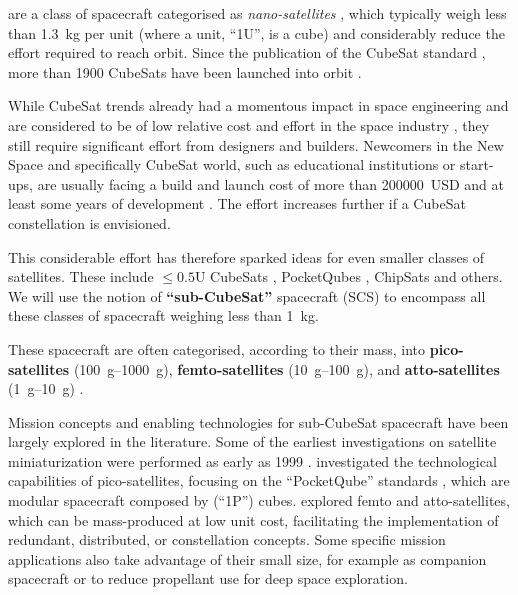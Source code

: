 \documentclass[journal,10pt]{IEEEtran}
\begin{document}
 are a class of spacecraft categorised as \emph{nano-satellites} \autocite{kuluNanosatsDatabase2023}, which typically weigh less than \SI{1.3}{\kilo\gram} per unit (where a unit, ``1U'', is a  cube) and considerably reduce the effort required to reach orbit.
Since the publication of the CubeSat standard \cite{CDS14}, more than 1900 CubeSats have been launched into orbit \autocite{kuluNanosatsDatabase2023}.

While CubeSat trends already had a momentous impact in space engineering and are considered to be of low relative cost and effort in the space industry \autocite{poghosyanCubeSatEvolutionAnalyzing2017, sweetingModernSmallSatellitesChanging2018}, they still require significant effort from designers and builders. Newcomers in the New Space and specifically CubeSat world, such as educational institutions or start-ups, are usually facing a build and launch cost of more than \SI{200000}{USD} and at least some years of development \autocite{nasacubesatlaunchinitiativeCubeSat101Basic2017}. The effort increases further if a CubeSat constellation is envisioned.

This considerable effort has therefore sparked ideas for even smaller classes of satellites.
These include \( \leq 0.5\mathrm{U}\) CubeSats \autocite{kuluNanosatsDatabase2023},
PocketQubes \autocite{PQ1},
ChipSats \autocite{manchesterCentimeterScaleSpacecraftDesign2015} and others.
We will use the notion of \textbf{``sub-CubeSat''} spacecraft (\acs{SCS}) to encompass all these classes of spacecraft weighing less than \SI{1}{\kilo\gram}.

These spacecraft are often categorised, according to their mass, into
\textbf{pico-satellites} (\SIrange{100}{1000}{\gram}),
\textbf{femto-satellites} (\SIrange{10}{100}{\gram}), and
\textbf{atto-satellites} (\SIrange{1}{10}{\gram})
\autocite{sweetingModernSmallSatellitesChanging2018,heinAttoSatsChipSatsOther2019}.

Mission concepts and enabling technologies for sub-CubeSat spacecraft have been largely explored in the literature. Some of the earliest investigations on satellite miniaturization were performed as early as 1999 \autocite{jansonMassproducibleSiliconSpacecraft1999,barnhartEnablingSpaceSensor2007}.
\citeauthor{sperettaCubeSatsPocketQubesOpportunities2016} \autocite{sperettaCubeSatsPocketQubesOpportunities2016} investigated the technological capabilities of pico-satellites, focusing on the ``PocketQube'' standards \autocite{PQ1,PQ91}, which are modular spacecraft composed by  (``1P'') cubes. \citeauthor{heinAttoSatsChipSatsOther2019,perezSurveyCurrentFemtosatellite2016} \autocite{heinAttoSatsChipSatsOther2019,perezSurveyCurrentFemtosatellite2016} explored femto and atto-satellites, which can be mass-produced at low unit cost, facilitating the implementation of redundant, distributed, or constellation concepts. Some specific mission applications also take advantage of their small size, for example as companion spacecraft or to reduce propellant use for deep space exploration.
\end{document}
